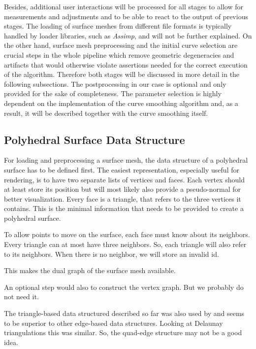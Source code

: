 \documentclass{stdlocal}
\begin{document}
  Besides, additional user interactions will be processed for all stages to allow for measurements and adjustments and to be able to react to the output of previous stages.
  The loading of surface meshes from different file formats is typically handled by loader libraries, such as \textit{Assimp}, and will not be further explained.
  On the other hand, surface mesh preprocessing and the initial curve selection are crucial steps in the whole pipeline which remove geometric degeneracies and artifacts that would otherwise violate assertions needed for the correct execution of the algorithm.
  Therefore both stages will be discussed in more detail in the following subsections.
  The postprocessing in our case is optional and only provided for the sake of completeness.
  The parameter selection is highly dependent on the implementation of the curve smoothing algorithm and, as a result, it will be described together with the curve smoothing itself.

\subsection{Polyhedral Surface Data Structure} %
\label{sub:polyhedral_surface_data_structure}
  For loading and preprocessing a surface mesh, the data structure of a polyhedral surface has to be defined first.
  The easiest representation, especially useful for rendering, is to have two separate lists of vertices and faces.
  Each vertex should at least store its position but will most likely also provide a pseudo-normal for better visualization.
  Every face is a triangle, that refers to the three vertices it contains.
  This is the minimal information that needs to be provided to create a polyhedral surface.

  To allow points to move on the surface, each face must know about its neighbors.
  Every triangle can at most have three neighbors.
  So, each triangle will also refer to its neighbors.
  When there is no neighbor, we will store an invalid id.

  This makes the dual graph of the surface mesh available.


  An optional step would also to construct the vertex graph.
  But we probably do not need it.

  The triangle-based data structured described so far was also used by \textcite{mancinelli2022} and seems to be superior to other edge-based data structures.
  Looking at Delaunay triangulations this was similar.
  So, the quad-edge structure may not be a good idea.
\end{document}
